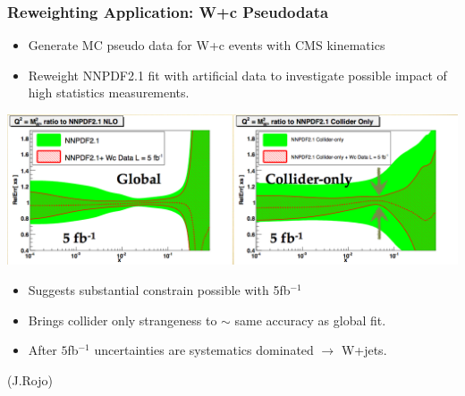 \documentclass[10pt]{beamer}
\begin{document}
\begin{frame}
\frametitle{Reweighting Application: W+c Pseudodata}

\begin{itemize}
		\item<1-> \small Generate MC pseudo data for W+c events with CMS kinematics 
		\item<1-> \small Reweight NNPDF2.1 fit with artificial data to investigate possible impact of high statistics measurements.
\end{itemize}
\includegraphics[width=\textwidth]{wCrw.png}
\begin{itemize}
		\item<1-> \small Suggests substantial constrain possible with 5fb$^{-1}$
		\item<1-> \small Brings collider only strangeness to $\sim$ same accuracy as global fit.
		\item<1-> \small After $5$fb$^{-1}$ uncertainties are systematics dominated $\to$ W+jets.

\end{itemize}
\vskip20pt
\hfill (J.Rojo)
\end{frame}
\end{document}
